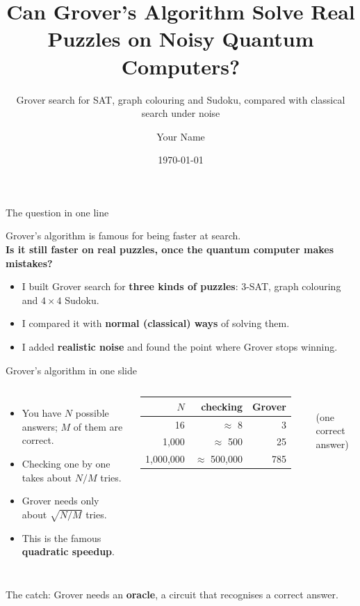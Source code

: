 \documentclass[aspectratio=169,11pt]{beamer}
\title{Can Grover's Algorithm Solve Real Puzzles on Noisy Quantum Computers?}
\subtitle{Grover search for SAT, graph colouring and Sudoku, compared with classical search under noise}
\author{Your Name}
\institute{Supervisor: Prof.\ Name}
\date{\today}
\begin{document}
\maketitle

\begin{frame}{The question in one line}
\begin{center}
\Large Grover's algorithm is famous for being faster at search.\\[0.4em]
\textbf{Is it still faster on real puzzles, once the quantum computer makes mistakes?}
\end{center}
\vspace{1em}
\begin{itemize}
\item I built Grover search for \textbf{three kinds of puzzles}: 3-SAT, graph colouring and $4\times4$ Sudoku.
\item I compared it with \textbf{normal (classical) ways} of solving them.
\item I added \textbf{realistic noise} and found the point where Grover stops winning.
\end{itemize}
\end{frame}

\begin{frame}{Grover's algorithm in one slide}
\begin{columns}[T]
\begin{itemize}
\item You have $N$ possible answers; $M$ of them are correct.
\item Checking one by one takes about $N/M$ tries.
\item Grover needs only about $\sqrt{N/M}$ tries.
\item This is the famous \textbf{quadratic speedup}.
\end{itemize}
\begin{tabular}{@{}rrr@{}}
\toprule
$N$ & checking & Grover \\
\midrule
16 & $\approx$ 8 & 3 \\
1{,}000 & $\approx$ 500 & 25 \\
1{,}000{,}000 & $\approx$ 500{,}000 & 785 \\
\bottomrule
\end{tabular}\\[0.4em]
{\small (one correct answer)}
\end{columns}
\vspace{1em}
\alert{The catch:} Grover needs an \textbf{oracle}, a circuit that recognises a correct answer.
\end{frame}
\end{document}
